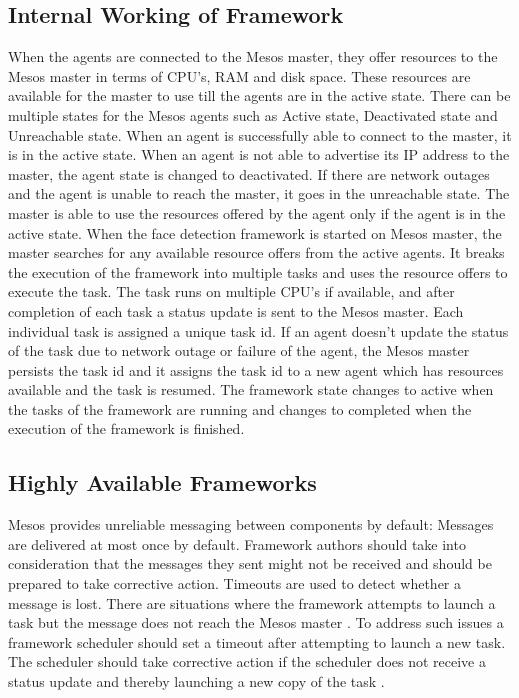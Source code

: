 \documentclass[9pt,twocolumn,twoside]{../../styles/osajnl}
\begin{document}
\subsection{Internal Working of Framework}
When the agents are connected to the Mesos master, they offer
resources to the Mesos master in terms of CPU's, RAM and disk
space. These resources are available for the master to use till the
agents are in the active state. There can be multiple states for the
Mesos agents such as Active state, Deactivated state and Unreachable
state. When an agent is successfully able to connect to the master, it
is in the active state. When an agent is not able to advertise its IP
address to the master, the agent state is changed to deactivated. If
there are network outages and the agent is unable to reach the master,
it goes in the unreachable state. The master is able to use the
resources offered by the agent only if the agent is in the active
state. When the face detection framework is started on Mesos master,
the master searches for any available resource offers from the active
agents. It breaks the execution of the framework into multiple tasks
and uses the resource offers to execute the task. The task runs on
multiple CPU's if available, and after completion of each task a
status update is sent to the Mesos master. Each individual task is
assigned a unique task id. If an agent doesn't update the status of
the task due to network outage or failure of the agent, the Mesos
master persists the task id and it assigns the task id to a new agent
which has resources available and the task is resumed. The framework
state changes to active when the tasks of the framework are running
and changes to completed when the execution of the framework is
finished.

\subsection{Highly Available Frameworks}
Mesos provides unreliable messaging between components by default:
Messages are delivered at most once by default. Framework authors
should take into consideration that the messages they sent might not
be received and should be prepared to take corrective action. Timeouts
are used to detect whether a message is lost. There are situations
where the framework attempts to launch a task but the message does not
reach the Mesos master \cite{www-mesos-frmwrk}. To address such issues
a framework scheduler should set a timeout after attempting to launch
a new task. The scheduler should take corrective action if the
scheduler does not receive a status update and thereby launching a new
copy of the task \cite{www-mesos-arch}.
\end{document}
